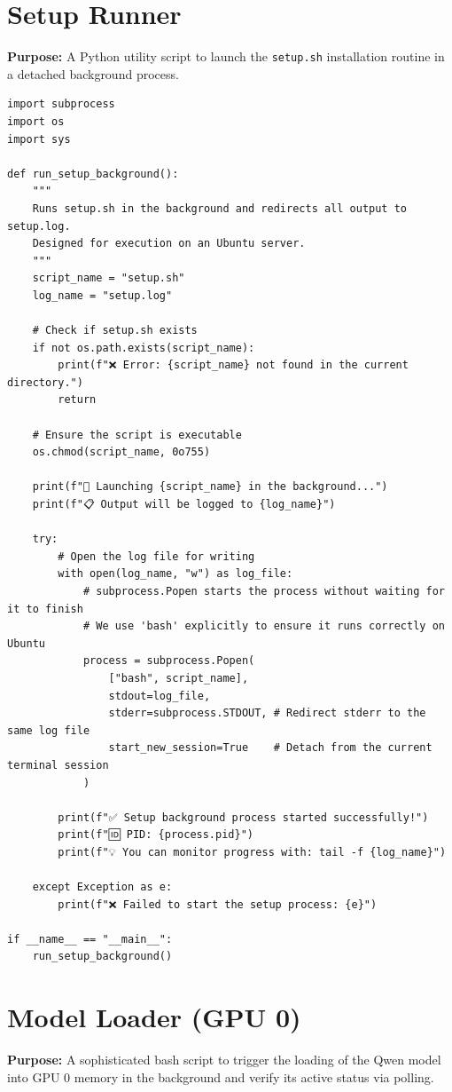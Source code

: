 \documentclass[11pt]{article}
\begin{document}
\section{Setup Runner} \label{sec:runsetup}
\textbf{Purpose:} A Python utility script to launch the \texttt{setup.sh} installation routine in a detached background process.

\begin{lstlisting}[style=pythoncode, caption={run\_setup.py}]
import subprocess
import os
import sys

def run_setup_background():
    """
    Runs setup.sh in the background and redirects all output to setup.log.
    Designed for execution on an Ubuntu server.
    """
    script_name = "setup.sh"
    log_name = "setup.log"
    
    # Check if setup.sh exists
    if not os.path.exists(script_name):
        print(f"❌ Error: {script_name} not found in the current directory.")
        return

    # Ensure the script is executable
    os.chmod(script_name, 0o755)

    print(f"🚀 Launching {script_name} in the background...")
    print(f"📋 Output will be logged to {log_name}")

    try:
        # Open the log file for writing
        with open(log_name, "w") as log_file:
            # subprocess.Popen starts the process without waiting for it to finish
            # We use 'bash' explicitly to ensure it runs correctly on Ubuntu
            process = subprocess.Popen(
                ["bash", script_name],
                stdout=log_file,
                stderr=subprocess.STDOUT, # Redirect stderr to the same log file
                start_new_session=True    # Detach from the current terminal session
            )
        
        print(f"✅ Setup background process started successfully!")
        print(f"🆔 PID: {process.pid}")
        print(f"💡 You can monitor progress with: tail -f {log_name}")

    except Exception as e:
        print(f"❌ Failed to start the setup process: {e}")

if __name__ == "__main__":
    run_setup_background()
\end{lstlisting}

\section{Model Loader (GPU 0)} \label{sec:loader0}
\textbf{Purpose:} A sophisticated bash script to trigger the loading of the Qwen model into GPU 0 memory in the background and verify its active status via polling.
\end{document}
